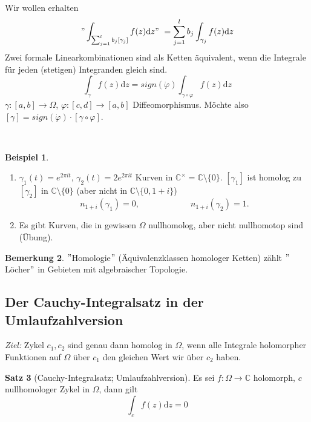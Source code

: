 \documentclass[11pt,titlepage]{article}
\theoremstyle{definition}
\newtheorem{theorem}{Satz}[section]
\newtheorem{example}[theorem]{Beispiel}
\newtheorem{remark}[theorem]{Bemerkung}
\theoremstyle{remark}
\begin{document}
	\ \\
	
	Wir wollen erhalten 
	\[ "\int_{\sum_{j=1}^l b_j [\gamma_j]}f(z)\mathrm{d}z"\  = \sum_{j=1}^l b_j \int_{\gamma_j}f(z)\mathrm{d}z \]
	Zwei formale Linearkombinationen sind als Ketten äquivalent, wenn die Integrale für jeden (stetigen) 
	Integranden gleich sind. 
	\[ \int_{\gamma}f(z)\mathrm{d}z=sign(\dot{\varphi})\int_{\gamma\circ\varphi}f(z)\mathrm{d}z \]
	$\gamma:[a,b]\to\Omega$, $\varphi:[c,d]\to[a,b]$ Diffeomorphismus. Möchte also $[\gamma]=
	sign(\dot{\varphi})\cdot [\gamma\circ\varphi]$.
	
	\ \\
	
	\begin{example}
		\begin{enumerate}
			\item $\gamma_1(t)=e^{2\pi it}$, $\gamma_2(t)=2e^{2\pi it}$ Kurven in $\mathbb{C}^{\times}
			=\mathbb{C}\setminus\{0\}$. $[\gamma_1]$ ist homolog zu $[\gamma_2]$ in $\mathbb{C}
			\setminus\{0\}$ (aber nicht in $\mathbb{C}\setminus\{0,1+i\}$)
			\[n_{1+i}(\gamma_1)=0,\qquad \qquad \qquad n_{1+i}(\gamma_2)=1.\]
			
			\item Es gibt Kurven, die in gewissen $\Omega$ nullhomolog, aber nicht nullhomotop sind 
			(Übung).
		\end{enumerate}
	\end{example}
	
	\begin{remark}
		$"$Homologie$"$ (Äquivalenzklassen homologer Ketten) zählt $"$Löcher$"$ in Gebieten mit 
		algebraischer Topologie.
	\end{remark}
	
	\subsection{Der Cauchy-Integralsatz in der Umlaufzahlversion}
	
	\textsl{Ziel:} Zykel $c_1, c_2$ sind genau dann homolog in $\Omega$, wenn alle Integrale holomorpher 
	Funktionen auf $\Omega$ über $c_1$ den gleichen Wert wir über $c_2$ haben.
	
	\begin{theorem}[Cauchy-Integralsatz; Umlaufzahlversion] \label{thm:CI;umlauf}
		Es sei $f:\Omega\to\mathbb{C}$ holomorph, $c$ nullhomologer Zykel in $\Omega$, dann gilt
		\[ \int_c f(z)\mathrm{d}z=0 \]
	\end{theorem}
	
\end{document}
